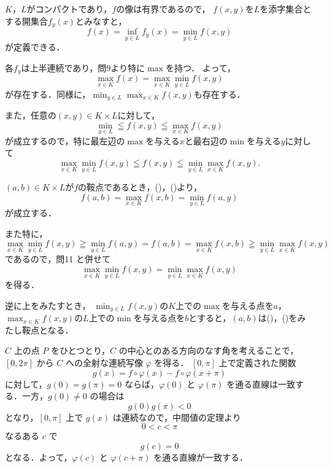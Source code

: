 
\begin{tproof}
    $K$，$L$がコンパクトであり，$f$の像は有界であるので，
    $f(x,y)$を$L$を添字集合とする開集合$f_y (x)$とみなすと，
    \[
        f(x) =\inf_{y \in L} f_y (x)=\min_{y \in L} f(x,y)
    \]
    が定義できる．

    各$f_y$は上半連続であり，問9より特に$\max $を持つ．
    よって，
    \[
        \max_{x \in K} f(x) = \max_{x \in K} \min_{y \in L} f(x,y)
    \]
    が存在する．同様に，$\min_{y \in L} \max_{x \in K} f(x,y)$も存在する．

    また，任意の$(x,y) \in K \times L$に対して，
    \[
        \min_{y \in L} \leqq f(x,y) \leqq \max_{x \in K} f(x,y)
    \]
    が成立するので，特に最左辺の$\max$を与える$x$と最右辺の$\min$を与える$y$に対して
    \[
        \max_{x \in K} \min_{y \in L} f(x,y) \leqq f(x,y) \leqq \min_{y \in L} \max_{x \in K} f(x,y).
    \]
\end{tproof}





\begin{tproof}
    $(a,b) \in K \times L$が$f$の鞍点であるとき，()，()より，
    \[
        f(a,b) = \max_{x \in K} f(x,b) = \min_{y \in L} f(a,y)
    \]
    が成立する．

    また特に，
    \[
        \max_{x \in K} \min_{y \in L} f(x,y) \geqq \min_{y \in L} f(a,y) =f(a,b)= \max_{x \in K} f(x,b) \geqq \min_{y \in L} \max_{x \in K} f(x,y)
    \]
    であるので，問11 と併せて
    \[
        \max_{x \in K} \min_{y \in L} f(x,y) = \min_{y \in L} \max_{x \in K} f(x,y)
    \]
    を得る．

    逆に上をみたすとき，
    $\min_{y \in L} f(x,y)$の$K$上での$\max$を与える点を$a$，
    $\max_{x \in K} f(x,y)$の$L$上での$\min$を与える点を$b$とすると，$(a,b)$は()，()をみたし鞍点となる．
\end{tproof}



\begin{tproof}
    $C$ 上の点 $P$ をひとつとり，$C$ の中心とのある方向のなす角を考えることで，
    $[0,2\pi]$ から $C$ への全射な連続写像 $\varphi$ を得る．
    $[0,\pi]$ 上で定義された関数
    \[
        g(x) = f\circ \varphi(x) - f \circ \varphi(x+\pi)
    \]
    に対して，$g(0) = g(\pi) = 0$ ならば，$\varphi(0)$ と $\varphi(\pi)$ を通る直線は一致する．一方，$g(0) \ne 0$ の場合は
    \[
        g(0)g(\pi) < 0
    \]
    となり，$[0,\pi]$ 上で $g(x)$ は連続なので，中間値の定理より
    \[
        0 < c < \pi
    \]
    なるある $c$ で
    \[
        g(c) = 0
    \]
    となる．よって，$\varphi(c)$ と $\varphi(c+\pi)$ を通る直線が一致する．
\end{tproof}


